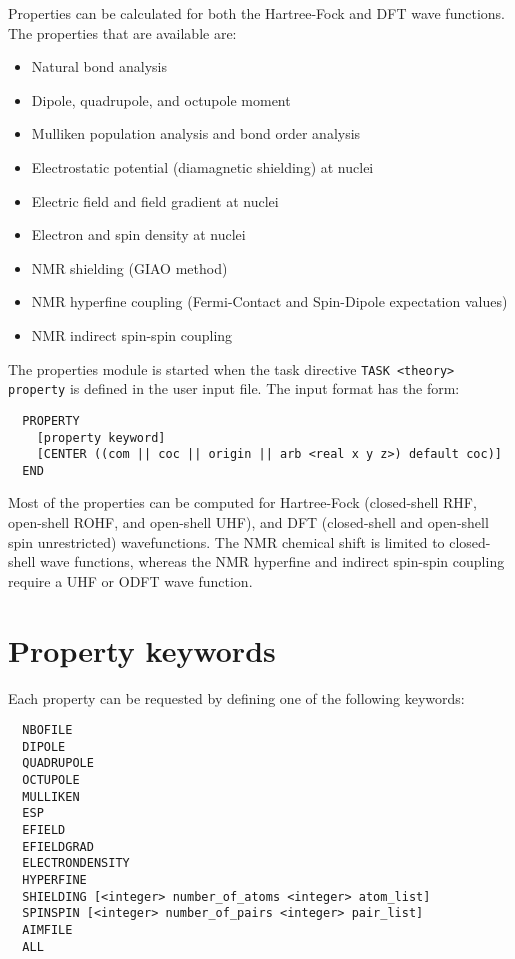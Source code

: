 %
%
\label{sec:property}

Properties can be calculated for both the Hartree-Fock and DFT wave 
functions. The properties that are available are:

\begin{itemize}
\item Natural bond analysis
\item Dipole, quadrupole, and octupole moment 
\item Mulliken population analysis and bond order analysis
\item Electrostatic potential (diamagnetic shielding) at nuclei 
\item Electric field and field gradient at nuclei 
\item Electron and spin density at nuclei 
\item NMR shielding (GIAO method)
\item NMR hyperfine coupling (Fermi-Contact and Spin-Dipole expectation values)
\item NMR indirect spin-spin coupling
\end{itemize}

The properties module is started when the task directive
\verb+TASK <theory> property+ is defined in the user input file. The input 
format has the form:

\begin{verbatim}
  PROPERTY
    [property keyword]
    [CENTER ((com || coc || origin || arb <real x y z>) default coc)]
  END
\end{verbatim}

Most of the properties can be computed for Hartree-Fock
(closed-shell RHF, open-shell ROHF, and open-shell UHF), and DFT
(closed-shell and open-shell spin unrestricted) wavefunctions. The NMR
chemical shift is limited to closed-shell wave functions, whereas the NMR 
hyperfine and indirect spin-spin coupling require a UHF or ODFT wave function.

\section{Property keywords}

Each property can be requested by defining one of the following keywords:

\begin{verbatim}
  NBOFILE
  DIPOLE
  QUADRUPOLE
  OCTUPOLE
  MULLIKEN
  ESP
  EFIELD
  EFIELDGRAD
  ELECTRONDENSITY
  HYPERFINE
  SHIELDING [<integer> number_of_atoms <integer> atom_list]
  SPINSPIN [<integer> number_of_pairs <integer> pair_list]
  AIMFILE
  ALL
\end{verbatim}

